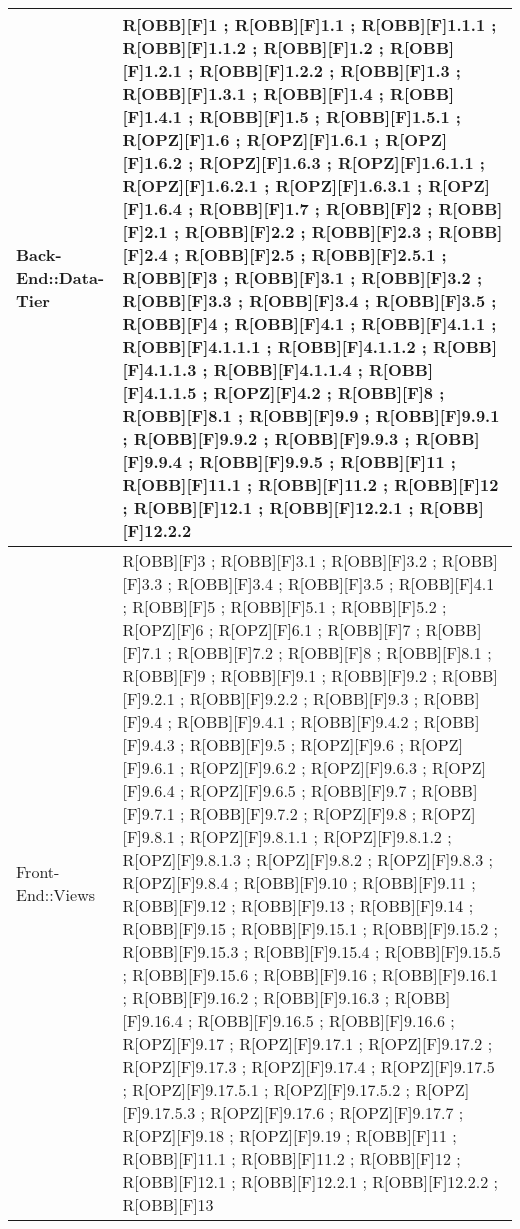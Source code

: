 	\begin{table}[h]
		\centering
		\begin{tabular}{|p{}|p{}|}
			\midrule

			Back-End::Data-Tier & R[OBB][F]1 ; R[OBB][F]1.1 ; R[OBB][F]1.1.1 ; R[OBB][F]1.1.2 ; R[OBB][F]1.2 ; R[OBB][F]1.2.1 ; R[OBB][F]1.2.2 ; R[OBB][F]1.3 ; R[OBB][F]1.3.1 ; R[OBB][F]1.4 ; R[OBB][F]1.4.1 ; R[OBB][F]1.5 ; R[OBB][F]1.5.1 ; R[OPZ][F]1.6 ; R[OPZ][F]1.6.1 ; R[OPZ][F]1.6.2 ; R[OPZ][F]1.6.3 ; R[OPZ][F]1.6.1.1 ; R[OPZ][F]1.6.2.1 ; R[OPZ][F]1.6.3.1 ; R[OPZ][F]1.6.4 ; R[OBB][F]1.7 ; R[OBB][F]2 ; R[OBB][F]2.1 ; R[OBB][F]2.2 ; R[OBB][F]2.3 ; R[OBB][F]2.4 ; R[OBB][F]2.5 ; R[OBB][F]2.5.1 ; R[OBB][F]3 ; R[OBB][F]3.1 ; R[OBB][F]3.2 ; R[OBB][F]3.3 ; R[OBB][F]3.4 ; R[OBB][F]3.5 ; R[OBB][F]4 ; R[OBB][F]4.1 ; R[OBB][F]4.1.1 ; R[OBB][F]4.1.1.1 ; R[OBB][F]4.1.1.2 ; R[OBB][F]4.1.1.3 ; R[OBB][F]4.1.1.4 ; R[OBB][F]4.1.1.5 ; R[OPZ][F]4.2 ; R[OBB][F]8 ; R[OBB][F]8.1 ; R[OBB][F]9.9 ; R[OBB][F]9.9.1 ; R[OBB][F]9.9.2 ; R[OBB][F]9.9.3 ; R[OBB][F]9.9.4 ; R[OBB][F]9.9.5 ; R[OBB][F]11 ; R[OBB][F]11.1 ; R[OBB][F]11.2 ; R[OBB][F]12 ; R[OBB][F]12.1 ; R[OBB][F]12.2.1 ; R[OBB][F]12.2.2 \\ \midrule
			Front-End::Views & R[OBB][F]3 ; R[OBB][F]3.1 ; R[OBB][F]3.2 ; R[OBB][F]3.3 ; R[OBB][F]3.4 ; R[OBB][F]3.5 ; R[OBB][F]4.1 ; R[OBB][F]5 ; R[OBB][F]5.1 ; R[OBB][F]5.2 ; R[OPZ][F]6 ; R[OPZ][F]6.1 ; R[OBB][F]7 ; R[OBB][F]7.1 ; R[OBB][F]7.2 ; R[OBB][F]8 ; R[OBB][F]8.1 ; R[OBB][F]9 ; R[OBB][F]9.1 ; R[OBB][F]9.2 ; R[OBB][F]9.2.1 ; R[OBB][F]9.2.2 ; R[OBB][F]9.3 ; R[OBB][F]9.4 ; R[OBB][F]9.4.1 ; R[OBB][F]9.4.2 ; R[OBB][F]9.4.3 ; R[OBB][F]9.5 ; R[OPZ][F]9.6 ; R[OPZ][F]9.6.1 ; R[OPZ][F]9.6.2 ; R[OPZ][F]9.6.3 ; R[OPZ][F]9.6.4 ; R[OPZ][F]9.6.5 ; R[OBB][F]9.7 ; R[OBB][F]9.7.1 ; R[OBB][F]9.7.2 ; R[OPZ][F]9.8 ; R[OPZ][F]9.8.1 ; R[OPZ][F]9.8.1.1 ; R[OPZ][F]9.8.1.2 ; R[OPZ][F]9.8.1.3 ; R[OPZ][F]9.8.2 ; R[OPZ][F]9.8.3 ; R[OPZ][F]9.8.4 ; R[OBB][F]9.10 ; R[OBB][F]9.11 ; R[OBB][F]9.12 ; R[OBB][F]9.13 ; R[OBB][F]9.14 ; R[OBB][F]9.15 ; R[OBB][F]9.15.1 ; R[OBB][F]9.15.2 ; R[OBB][F]9.15.3 ; R[OBB][F]9.15.4 ; R[OBB][F]9.15.5 ; R[OBB][F]9.15.6 ; R[OBB][F]9.16 ; R[OBB][F]9.16.1 ; R[OBB][F]9.16.2 ; R[OBB][F]9.16.3 ; R[OBB][F]9.16.4 ; R[OBB][F]9.16.5 ; R[OBB][F]9.16.6 ; R[OPZ][F]9.17 ; R[OPZ][F]9.17.1 ; R[OPZ][F]9.17.2 ; R[OPZ][F]9.17.3 ; R[OPZ][F]9.17.4 ; R[OPZ][F]9.17.5 ; R[OPZ][F]9.17.5.1 ; R[OPZ][F]9.17.5.2 ; R[OPZ][F]9.17.5.3 ; R[OPZ][F]9.17.6 ; R[OPZ][F]9.17.7 ; R[OPZ][F]9.18 ; R[OPZ][F]9.19 ; R[OBB][F]11 ; R[OBB][F]11.1 ; R[OBB][F]11.2 ; R[OBB][F]12 ; R[OBB][F]12.1 ; R[OBB][F]12.2.1 ; R[OBB][F]12.2.2 ; R[OBB][F]13 \\ \midrule

		\end{tabular}
	\end{table}
	\newpage
	
